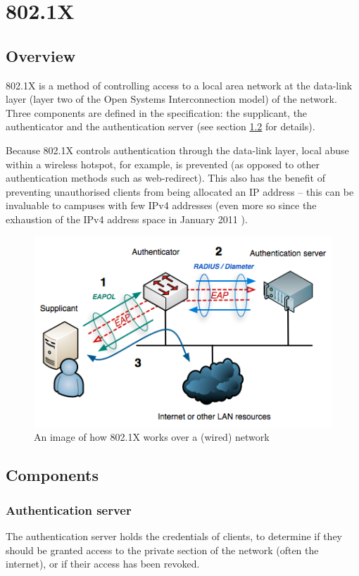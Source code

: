 \documentclass[12pt,a4paper,titlepage]{article}
\begin{document}
\newpage
\section{802.1X}
\subsection{Overview}
802.1X is a method of controlling access to a local area network at the data-link layer (layer two of the Open Systems Interconnection model) of the network. Three components are defined in the specification: the supplicant, the authenticator and the authentication server (see section \ref{sec:8021X;sub:components} for details).

Because 802.1X controls authentication through the data-link layer, local abuse within a wireless hotspot, for example, is prevented (as opposed to other authentication methods such as web-redirect). This also has the benefit of preventing unauthorised clients from being allocated an IP address -- this can be invaluable to campuses with few IPv4 addresses (even more so since the exhaustion of the IPv4 address space in January 2011 \cite{icaan11}).

\begin{figure}[h!]
\centering
\includegraphics[scale=0.7]{./images/8021X.png}
\caption{An image of how 802.1X works over a (wired) network \cite{image8021X}}
\end{figure}

\subsection{Components}
\label{sec:8021X;sub:components}
\subsubsection{Authentication server}
The authentication server holds the credentials of clients, to determine if they should be granted access to the private section of the network (often the internet), or if their access has been revoked.
\end{document}
